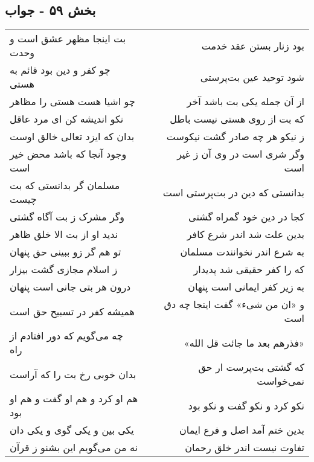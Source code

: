 \begin{center}
\section*{بخش ۵۹ - جواب}
\label{sec:sh059}
\begin{longtable}{l p{0.5cm} r}
بت اینجا مظهر عشق است و وحدت
&&
بود زنار بستن عقد خدمت
\\
چو کفر و دین بود قائم به هستی
&&
شود توحید عین بت‌پرستی
\\
چو اشیا هست هستی را مظاهر
&&
از آن جمله یکی بت باشد آخر
\\
نکو اندیشه کن ای مرد عاقل
&&
که بت از روی هستی نیست باطل
\\
بدان که ایزد تعالی خالق اوست
&&
ز نیکو هر چه صادر گشت نیکوست
\\
وجود آنجا که باشد محض خیر است
&&
وگر شری است در وی آن ز غیر است
\\
مسلمان گر بدانستی که بت چیست
&&
بدانستی که دین در بت‌پرستی است
\\
وگر مشرک ز بت آگاه گشتی
&&
کجا در دین خود گمراه گشتی
\\
ندید او از بت الا خلق ظاهر
&&
بدین علت شد اندر شرع کافر
\\
تو هم گر زو ببینی حق پنهان
&&
به شرع اندر نخوانندت مسلمان
\\
ز اسلام مجازی گشت بیزار
&&
که را کفر حقیقی شد پدیدار
\\
درون هر بتی جانی است پنهان
&&
به زیر کفر ایمانی است پنهان
\\
همیشه کفر در تسبیح حق است
&&
و «ان من شیء» گفت اینجا چه دق است
\\
چه می‌گویم که دور افتادم از راه
&&
«فذرهم بعد ما جائت قل الله»
\\
بدان خوبی رخ بت را که آراست
&&
که گشتی بت‌پرست ار حق نمی‌خواست
\\
هم او کرد و هم او گفت و هم او بود
&&
نکو کرد و نکو گفت و نکو بود
\\
یکی بین و یکی گوی و یکی دان
&&
بدین ختم آمد اصل و فرع ایمان
\\
نه من می‌گویم این بشنو ز قرآن
&&
تفاوت نیست اندر خلق رحمان
\\
\end{longtable}
\end{center}
